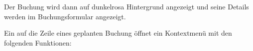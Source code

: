 Der Buchung wird dann auf \colorbox[RGB]{245,155,155}{dunkelrosa Hintergrund} angezeigt und seine Details werden im Buchungsformular angezeigt.

\vspace{2mm}
Ein  auf die Zeile eines geplanten Buchung öffnet ein Kontextmenü mit den folgenden Funktionen:

